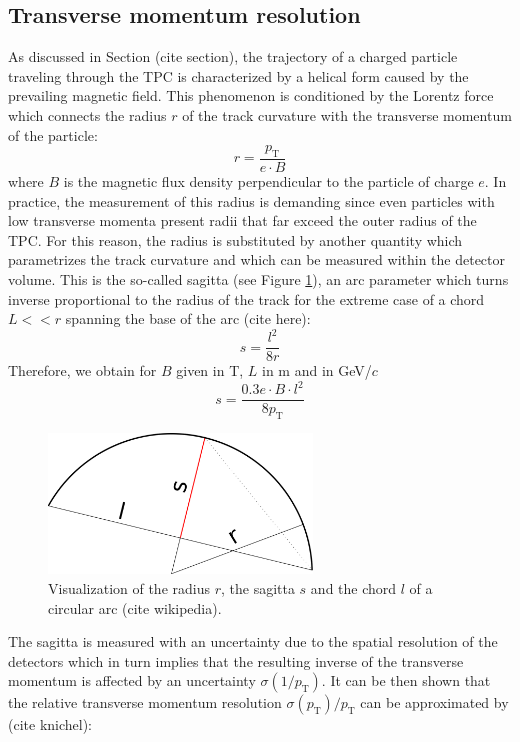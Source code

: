 \documentclass[12pt,a4paper]{report}
\begin{document}
\subsection{Transverse momentum resolution}
As discussed in Section (cite section), the trajectory of a charged particle traveling through the TPC is characterized by a helical form caused by the prevailing magnetic field. This phenomenon is conditioned by the Lorentz force which connects the radius $r$ of the track curvature with the transverse momentum \pt of the particle:
\begin{equation}
r = \dfrac{p_\text{T}}{e\cdot B}
\label{radius}
\end{equation}
where $B$ is the magnetic flux density perpendicular to the particle of charge $e$. In practice, the measurement of this radius is demanding since even particles with low transverse momenta present radii that far exceed the outer radius of the TPC. For this reason, the radius is substituted by another quantity which parametrizes the track curvature and which can be measured within the detector volume. This is the so-called sagitta (see Figure \ref{Sagitta}), an arc parameter which turns inverse proportional to the radius of the track for the extreme case of a chord $L<<r$ spanning the base of the arc (cite here):
\begin{equation}
s = \dfrac{l^2}{8r}
\end{equation}
Therefore, we obtain for $B$ given in T, $L$ in m and \pt in GeV/$c$
\begin{equation}
s = \dfrac{0.3e \cdot B \cdot l^2}{8p_\text{T}}
\end{equation}
\begin{figure}[tb!]
\centering
\includegraphics[width=7cm]{Plots/Sagitta.png}  
\caption{Visualization of the radius $r$, the sagitta $s$ and the chord $l$ of a circular arc (cite wikipedia).}
\label{Sagitta}
\end{figure}
\hspace{-0.25cm} The sagitta is measured with an uncertainty due to the spatial resolution of the detectors which in turn implies that the resulting inverse of the transverse momentum is affected by an uncertainty $\sigma(1/p_\text{T})$. It can be then shown that the relative transverse momentum resolution $\sigma(p_\text{T})/p_\text{T}$ can be approximated by (cite knichel):
\end{document}
